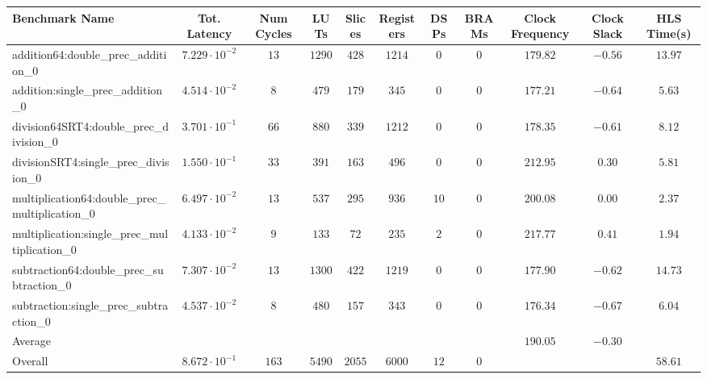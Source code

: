 \begin{tabular}{|l|c|c|c|c|c|c|c|c|c|c|}
\hline
Benchmark Name                                   & Tot. Latency            & Num Cycles & LUTs     & Slices   & Registers & DSPs   & BRAMs & Clock Frequency & Clock Slack & HLS Time(s) \\
\hline
addition64:double\_prec\_addition\_0             & $ 7.229 \cdot 10^{-2} $ & $ 13     $ & $ 1290 $ & $ 428  $ & $ 1214  $ & $ 0  $ & $ 0 $ & $ 179.82      $ & $ -0.56   $ & $ 13.97   $ \\
addition:single\_prec\_addition\_0               & $ 4.514 \cdot 10^{-2} $ & $ 8      $ & $ 479  $ & $ 179  $ & $ 345   $ & $ 0  $ & $ 0 $ & $ 177.21      $ & $ -0.64   $ & $ 5.63    $ \\
division64SRT4:double\_prec\_division\_0         & $ 3.701 \cdot 10^{-1} $ & $ 66     $ & $ 880  $ & $ 339  $ & $ 1212  $ & $ 0  $ & $ 0 $ & $ 178.35      $ & $ -0.61   $ & $ 8.12    $ \\
divisionSRT4:single\_prec\_division\_0           & $ 1.550 \cdot 10^{-1} $ & $ 33     $ & $ 391  $ & $ 163  $ & $ 496   $ & $ 0  $ & $ 0 $ & $ 212.95      $ & $ 0.30    $ & $ 5.81    $ \\
multiplication64:double\_prec\_multiplication\_0 & $ 6.497 \cdot 10^{-2} $ & $ 13     $ & $ 537  $ & $ 295  $ & $ 936   $ & $ 10 $ & $ 0 $ & $ 200.08      $ & $ 0.00    $ & $ 2.37    $ \\
multiplication:single\_prec\_multiplication\_0   & $ 4.133 \cdot 10^{-2} $ & $ 9      $ & $ 133  $ & $ 72   $ & $ 235   $ & $ 2  $ & $ 0 $ & $ 217.77      $ & $ 0.41    $ & $ 1.94    $ \\
subtraction64:double\_prec\_subtraction\_0       & $ 7.307 \cdot 10^{-2} $ & $ 13     $ & $ 1300 $ & $ 422  $ & $ 1219  $ & $ 0  $ & $ 0 $ & $ 177.90      $ & $ -0.62   $ & $ 14.73   $ \\
subtraction:single\_prec\_subtraction\_0         & $ 4.537 \cdot 10^{-2} $ & $ 8      $ & $ 480  $ & $ 157  $ & $ 343   $ & $ 0  $ & $ 0 $ & $ 176.34      $ & $ -0.67   $ & $ 6.04    $ \\
\hline
Average                                          & $                     $ & $        $ & $      $ & $      $ & $       $ & $    $ & $   $ & $ 190.05      $ & $ -0.30   $ & $         $ \\
\hline
Overall                                          & $ 8.672 \cdot 10^{-1} $ & $ 163    $ & $ 5490 $ & $ 2055 $ & $ 6000  $ & $ 12 $ & $ 0 $ & $             $ & $         $ & $ 58.61   $ \\
\hline
\end{tabular}

